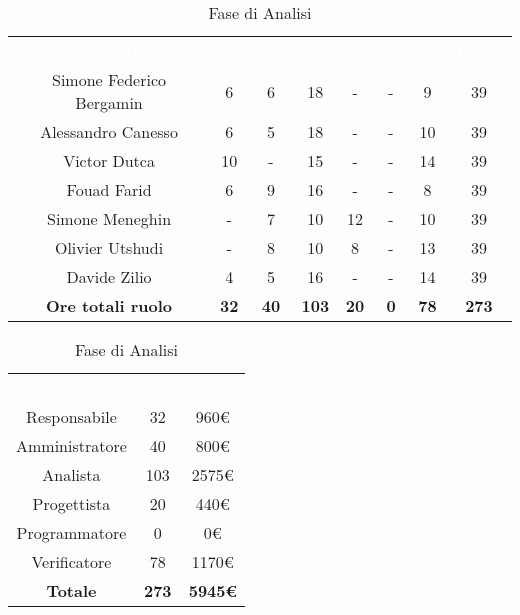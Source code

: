 \renewcommand{\arraystretch}{1.5}


\begin{table}[H]
\centering\renewcommand{\arraystretch}{1.5}
\caption{Fase di Analisi}
\vspace{0.2cm}
\begin{tabular}{ c | c | c | c | c | c | c | c }
\rowcolor{redafk}
\textcolor{white}{\textbf{Nominativo}} & \textcolor{white}{\textbf{Re}} & 
\textcolor{white}{\textbf{Am}} & \textcolor{white}{\textbf{An}} &
\textcolor{white}{\textbf{Pt}} & \textcolor{white}{\textbf{Pr}} &
\textcolor{white}{\textbf{Ve}} & \textcolor{white}{\textbf{Totale}} \\
Simone Federico Bergamin & 6 & 6 & 18 & - & - & 9 & 39 \\
Alessandro Canesso & 6 & 5 & 18 & - & - & 10 & 39 \\
Victor Dutca & 10 & - & 15 & - & - & 14 & 39 \\
Fouad Farid	& 6 & 9 & 16 & - & - & 8 & 39 \\
Simone Meneghin & - & 7 & 10 & 12 & - & 10 & 39 \\
Olivier Utshudi & - & 8 & 10 & 8 & - & 13 & 39 \\
Davide Zilio & 4 & 5 & 16 & - & - & 14 & 39 \\
\rowcolor{lastrowcolor}
\textbf{Ore totali ruolo} & \textbf{32} & \textbf{40} & \textbf{103} & \textbf{20} & \textbf{0} & \textbf{78} & \textbf{273} \\
\end{tabular}
\end{table}


\begin{table}[H]
\centering\renewcommand{\arraystretch}{1.5}
\caption{Fase di Analisi}
\vspace{0.2cm}
\begin{tabular}{ c | c | c  }
\rowcolor{redafk}
\textcolor{white}{\textbf{Ruolo}} & \textcolor{white}{\textbf{Ore}} & 
\textcolor{white}{\textbf{Costo}}  \\
Responsabile & 32 & 960€ \\
Amministratore & 40 & 800€ \\
Analista & 103 & 2575€ \\
Progettista	& 20 & 440€ \\
Programmatore & 0 & 0€  \\
Verificatore & 78 & 1170€  \\
\rowcolor{lastrowcolor}
\textbf{Totale} & \textbf{273} & \textbf{5945€}  \\
\end{tabular}
\end{table}
